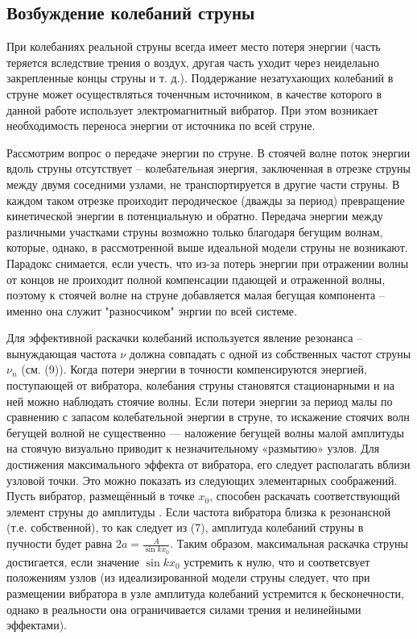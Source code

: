 \documentclass[a4paper,12pt]{article} %
\begin{document}
\subsection{Возбуждение колебаний струны}
При колебаниях реальной струны всегда имеет место потеря энергии (часть теряется вследствие трения о воздух, другая часть уходит через неиделаьно закрепленные концы струны и т. д.). Поддержание незатухающих колебаний в струне может осуществляться точенчным источником, в качестве которого в данной работе использует электромагнитный вибратор. При этом возникает необходимость переноса энергии от источника по всей струне.

Рассмотрим вопрос о передаче энергии по струне. В стоячей волне поток энергии вдоль струны отсутствует -- колебательная энергия, заключенная в отрезке струны между двумя соседними узлами, не транспортируется в другие части струны. В каждом таком отрезке проиходит перодическое (дважды за период) превращение кинетической энергии в потенциальную и обратно. Передача энергии между различными участками струны возможно только благодаря бегущим волнам, которые, однако, в рассмотренной выше идеальной модели струны не возникают. Парадокс снимается, если учесть, что из-за потерь энергии при отражении волны от концов не проиходит полной компенсации пдающей и отраженной волны, поэтому к стоячей волне на струне добавляется малая бегущая компонента -- именно она служит "разносчиком" энргии по всей системе. 

Для эффективной раскачки колебаний используется явление резонанса -- вынуждающая частота $\nu$ должна совпадать с одной из собственных частот струны $\nu_n$ (см. (9)). Когда потери энергии в точности компенсируются энергией, поступающей от вибратора, колебания струны становятся стационарными и на ней можно наблюдать стоячие волны. Если потери энергии за период малы по сравнению с запасом колебательной энергии в струне, то искажение стоячих волн бегущей волной не существенно — наложение бегущей волны малой амплитуды на стоячую визуально приводит к незначительному «размытию» узлов. Для достижения максимального эффекта от вибратора, его следует располагать вблизи узловой точки. Это можно показать из следующих элементарных соображений. Пусть вибратор, размещённый в точке $x_0$, способен раскачать соответствующий элемент струны до амплитуды . Если частота вибратора близка к резонансной (т.е. собственной), то как следует из (7), амплитуда колебаний струны в пучности будет равна $2a = \frac{A}{\sin kx_0}$. Таким образом, максимальная раскачка струны достигается, если значение $\sin kx_0$ устремить к нулю, что и соответсвует положениям узлов (из идеализированной модели струны следует, что при размещении вибратора в узле амплитуда колебаний устремится к бесконечности, однако в реальности она ограничивается силами трения и нелинейными эффектами).
\end{document}
